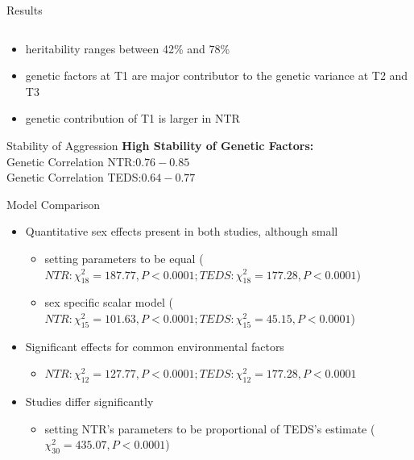 \documentclass{beamer}
\begin{document}
\begin{frame}[t]{Results}
\begin{columns}
\begin{column}{0.5\textwidth}
\begin{center}
   \end{center} 
      \end{column}
    \end{columns}
    \begin{itemize}
      \item heritability ranges between 42\% and 78\%
      \item genetic factors at T1 are major contributor to the genetic
variance at T2 and T3
      \item genetic contribution of T1 is larger in NTR
    \end{itemize}
  \end{frame}

  \begin{frame}[t]{Stability of Aggression}
    \textbf{High Stability of Genetic Factors:} \\
				Genetic Correlation NTR:\@ $0.76-0.85$ \\
				Genetic Correlation TEDS:\@ $0.64-0.77$ \\
        \vfill
  \end{frame}

  \begin{frame}[t]{Model Comparison}
    \begin{itemize}
      \item Quantitative sex effects present in both studies, although small
        \begin{itemize}
          \item setting parameters to be equal ($NTR: \chi^2_{18}=187.77, P< 0.0001; TEDS: \chi^2_{18}=177.28, P<0.0001$) 
          \item sex specific scalar model  ($NTR: \chi^2_{15}=101.63, P< 0.0001; TEDS: \chi^2_{15}=45.15, P<0.0001$)
        \end{itemize}
      \item Significant effects for common environmental factors
        \begin{itemize}
          \item $NTR: \chi^2_{12}=127.77, P<0.0001; TEDS: \chi^2_{12}=177.28, P<0.0001$
        \end{itemize}
      \item Studies differ significantly
        \begin{itemize}
          \item setting NTR's parameters to be proportional of TEDS's estimate ($\chi^2_{30}=435.07, P< 0.0001$)
        \end{itemize}
    \end{itemize}
  \end{frame}
\end{document}
